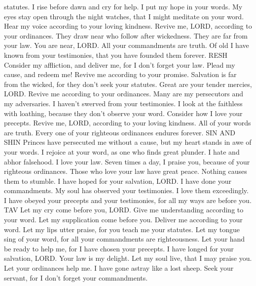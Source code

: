 statutes.  I rise before dawn and cry for help. I put my
hope in your words.  My eyes stay open through the night
watches, that I might meditate on your word.  Hear my
voice according to your loving kindness. Revive me, LORD, according to
your ordinances.  They draw near who follow after
wickedness. They are far from your law.  You are near,
LORD. All your commandments are truth.  Of old I have
known from your testimonies, that you have founded them forever. RESH
 Consider my affliction, and deliver me, for I don't
forget your law.  Plead my cause, and redeem me! Revive
me according to your promise.  Salvation is far from the
wicked, for they don't seek your statutes.  Great are
your tender mercies, LORD. Revive me according to your ordinances.
 Many are my persecutors and my adversaries. I haven't
swerved from your testimonies.  I look at the faithless
with loathing, because they don't observe your word. 
Consider how I love your precepts. Revive me, LORD, according to your
loving kindness.  All of your words are truth. Every one
of your righteous ordinances endures forever. SIN AND SHIN
 Princes have persecuted me without a cause, but my
heart stands in awe of your words.  I rejoice at your
word, as one who finds great plunder.  I hate and abhor
falsehood. I love your law.  Seven times a day, I praise
you, because of your righteous ordinances.  Those who
love your law have great peace. Nothing causes them to stumble.
 I have hoped for your salvation, LORD. I have done your
commandments.  My soul has observed your testimonies. I
love them exceedingly.  I have obeyed your precepts and
your testimonies, for all my ways are before you. TAV 
Let my cry come before you, LORD. Give me understanding according to
your word.  Let my supplication come before you. Deliver
me according to your word.  Let my lips utter praise,
for you teach me your statutes.  Let my tongue sing of
your word, for all your commandments are righteousness. 
Let your hand be ready to help me, for I have chosen your precepts.
 I have longed for your salvation, LORD. Your law is my
delight.  Let my soul live, that I may praise you. Let
your ordinances help me.  I have gone astray like a lost
sheep. Seek your servant, for I don't forget your commandments.

